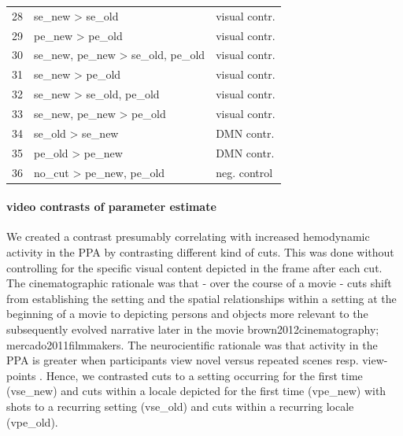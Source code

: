\documentclass[english]{article}
\begin{document}
\begin{table}
\begin{tabular}{lll}
28 & se\_new > se\_old & visual contr. \\
29 & pe\_new > pe\_old & visual contr. \\
30 & se\_new, pe\_new > se\_old, pe\_old & visual contr. \\
31 & se\_new > pe\_old & visual contr. \\
32 & se\_new > se\_old, pe\_old & visual contr. \\
33 & se\_new, pe\_new > pe\_old & visual contr. \\
34 & se\_old > se\_new & DMN  contr. \\
35 & pe\_old > pe\_new &  DMN contr. \\
36 & no\_cut > pe\_new, pe\_old & neg. control \\
\bottomrule
\end{tabular}
\end{table}

\paragraph{video contrasts of parameter estimate}
We created a contrast presumably correlating with increased hemodynamic activity in the PPA by contrasting different kind of cuts. This was done without controlling for the specific visual content depicted in the frame after each cut. The cinematographic rationale was that - over the course of a movie - cuts shift from establishing the setting and the spatial relationships within a setting at the beginning of a movie to depicting persons and objects more relevant to the subsequently evolved narrative later in the movie {brown2012cinematography; mercado2011filmmakers}. The neurocientific rationale was that activity in the PPA is greater when participants view novel versus repeated scenes resp. view-points \citep{epstein1999parahippocampal}. Hence, we contrasted cuts to a setting occurring for the first time (vse\_new) and cuts within a locale depicted for the first time (vpe\_new) with shots to a recurring setting (vse\_old) and cuts within a recurring locale (vpe\_old).
\end{document}
